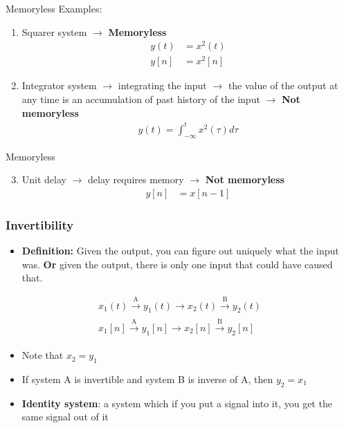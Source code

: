 \documentclass[pdflatex,compress,mathserif]{beamer}
\begin{document}
\begin{frame}{Memoryless}
	Examples:
	\begin{enumerate}
		\item Squarer system $\rightarrow$ \textbf{Memoryless}
		\begin{align*}
		y(t) &= x^2(t) \\
		y[n] &= x^2[n]
		\end{align*}
		\item Integrator system $\rightarrow$ integrating the input $\rightarrow$ the value of the output at any time is an accumulation of past history of the input $\rightarrow$ \textbf{Not memoryless}
		\begin{align*}
		y(t) = \int_{-\infty}^{t} x^2(\tau)d\tau
		\end{align*}
	\end{enumerate}
\end{frame}

\begin{frame}{Memoryless}
	\begin{enumerate}
		\setcounter{enumi}{2}
		\item Unit delay $\rightarrow$ delay requires memory $\rightarrow$ \textbf{Not memoryless}
		\begin{align*}
			y[n] &= x[n-1]
		\end{align*}
	\end{enumerate}
\end{frame}

\begin{frame}
	\frametitle{Invertibility}
	\begin{itemize}
		\item \textbf{Definition:} Given the output, you can figure out uniquely what the input was. \textbf{Or} given the output, there is only one input that could have caused that.
	\end{itemize}
	
	\begin{align*}
		x_1(t) \xrightarrow[\text{}]{\text{A}} y_1(t) \longrightarrow x_2(t) \xrightarrow[\text{}]{\text{B}} y_2(t) \\
		x_1[n] \xrightarrow[\text{}]{\text{A}} y_1[n] \longrightarrow x_2[n] \xrightarrow[\text{}]{\text{B}} y_2[n]
	\end{align*}
	\begin{itemize}
		\item[] Note that $ x_2 = y_1 $
		\item If system A is invertible and system B is inverse of A, then $ y_2 = x_1 $
		\item \textbf{Identity system}: a system which if you put a signal into it, you get the same signal out of it
	\end{itemize}
\end{frame}
\end{document}
